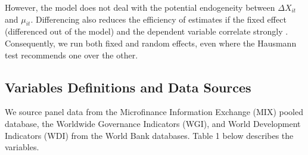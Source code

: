 \documentclass[a4paper,nobind]{templates/ociamthesis}
\begin{document}
However, the model does not deal with the potential endogeneity between \(\Delta X_{it}\) and \(\mu_{it}\). Differencing also reduces the efficiency of estimates if the fixed effect (differenced out of the model) and the dependent variable correlate strongly \autocite{clark2015should}. Consequently, we run both fixed and random effects, even where the Hausmann test recommends one over the other.

\hypertarget{variables-definitions-and-data-sources}{%
\subsection{Variables Definitions and Data Sources}\label{variables-definitions-and-data-sources}}

We source panel data from the Microfinance Information Exchange (MIX) pooled database, the Worldwide Governance Indicators (WGI), and World Development Indicators (WDI) from the World Bank databases. Table 1 below describes the variables.
\end{document}
